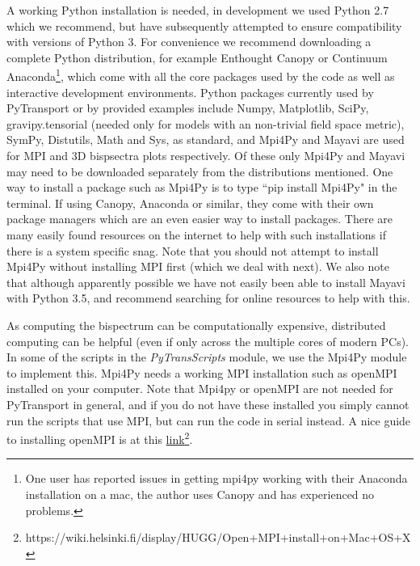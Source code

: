 \documentclass[10pt,
amsmath,amssymb,
aps,prd,nofootinbib,eqsecnum,a4paper]{revtex4}
\begin{document}
\vspace{0.2cm}
  A working Python installation is needed, in development we used Python 2.7 which we recommend, 
but have subsequently attempted to ensure compatibility with versions of Python 3. 
For convenience we recommend downloading a complete Python distribution, for  
  example Enthought Canopy or Continuum Anaconda\footnote{One user has reported issues in getting mpi4py working with 
  their Anaconda installation on a mac, the author uses Canopy and has experienced no problems.}, which 
  come with all the core packages used by the code as well as 
  interactive development environments.
  Python packages currently used by PyTransport or by provided examples include Numpy, Matplotlib, SciPy, 
  gravipy.tensorial (needed only for 
  models with an non-trivial field space metric), SymPy, Distutils, Math and Sys, 
  as standard, and Mpi4Py and Mayavi are used 
  for MPI and 3D bispsectra plots respectively. Of these only Mpi4Py and Mayavi may 
  need to be downloaded separately from the distributions mentioned. One way to install a package 
  such as Mpi4Py is to type 
 ``pip install Mpi4Py" in the terminal. If using Canopy, Anaconda or similar, they come with their 
 own package managers  which are an even easier way to install packages. 
 There are many 
 easily found resources on the internet to help with such installations if there is a system 
 specific snag. Note that you should not attempt to install Mpi4Py without installing MPI first (which we deal with next). We also note that although apparently possible we have not easily been able to install Mayavi with Python 3.5, and recommend searching for online resources to help with this.

\vspace{0.2cm}
As computing the bispectrum can be computationally expensive, distributed computing can be helpful 
(even if only across the multiple cores of modern PCs). 
In some of the scripts in the 
{\it PyTransScripts} module,  
we use the Mpi4Py module to implement this. Mpi4Py needs a working MPI installation such as 
openMPI installed on your 
computer. Note that Mpi4py or openMPI are not needed for 
PyTransport in general, and if you do not have these installed you simply  
cannot run the scripts that use MPI, but can run the code in serial instead. A nice guide to installing openMPI is 
at this \href{https://wiki.helsinki.fi/display/HUGG/Open+MPI+install+on+Mac+OS+X}{link}\footnote{https://wiki.helsinki.fi/display/HUGG/Open+MPI+install+on+Mac+OS+X}.
\end{document}
